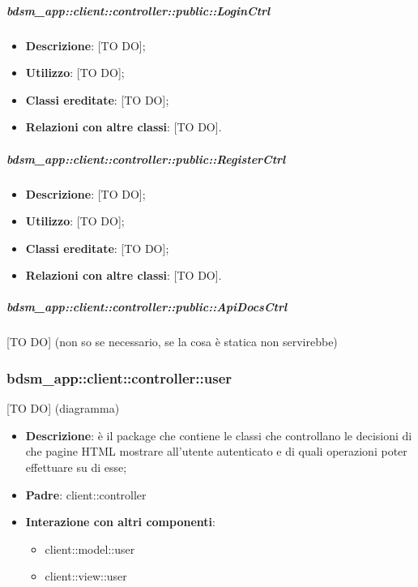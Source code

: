 		\subparagraph{bdsm\_app::client::controller::public::LoginCtrl} %
		\label{subp:bdsm_app_client_controller_public_loginctrl}
			\begin{itemize}
				\item \textbf{Descrizione}: [TO DO];
				\item \textbf{Utilizzo}: [TO DO];
				\item \textbf{Classi ereditate}: [TO DO];
				\item \textbf{Relazioni con altre classi}: [TO DO].
			\end{itemize}

		\subparagraph{bdsm\_app::client::controller::public::RegisterCtrl} %
		\label{subp:bdsm_app_client_controller_public_registerctrl}
			\begin{itemize}
				\item \textbf{Descrizione}: [TO DO];
				\item \textbf{Utilizzo}: [TO DO];
				\item \textbf{Classi ereditate}: [TO DO];
				\item \textbf{Relazioni con altre classi}: [TO DO].
			\end{itemize}

		\subparagraph{bdsm\_app::client::controller::public::ApiDocsCtrl} %
		\label{subp:bdsm_app_client_controller_public_apidocsctrl}
		[TO DO] (non so se necessario, se la cosa è statica non servirebbe)





\subsubsection{bdsm\_app::client::controller::user} %
\label{ssub:bdsm_app_client_controller_user}
[TO DO] (diagramma) \newline \newline

\begin{itemize}
	\item \textbf{Descrizione}: è il package che contiene le classi che controllano le decisioni di che pagine HTML mostrare all'utente autenticato e di quali operazioni poter effettuare su di esse;
	\item \textbf{Padre}: client::controller
	\item \textbf{Interazione con altri componenti}:
		\begin{itemize}
			\item client::model::user
			\item client::view::user
		\end{itemize}
\end{itemize}

